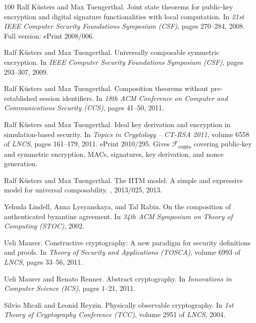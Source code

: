 \documentclass[11pt,a4paper]{article}
\begin{document}
\begin{thebibliography}{100}
Ralf K{\"u}sters and Max Tuengerthal.
\newblock Joint state theorems for public-key encryption and digital signature
  functionalities with local computation.
\newblock In {\em 21st IEEE Computer Security Foundations Symposium (CSF)},
  pages 270--284, 2008.
\newblock Full version: ePrint 2008/006.

Ralf K{\"u}sters and Max Tuengerthal.
\newblock Universally composable symmetric encryption.
\newblock In {\em IEEE Computer Security Foundations Symposium (CSF)}, pages
  293--307, 2009.

Ralf K{\"u}sters and Max Tuengerthal.
\newblock Composition theorems without pre-established session identifiers.
\newblock In {\em 18th ACM Conference on Computer and Communications Security
  (CCS)}, pages 41--50, 2011.

Ralf K{\"u}sters and Max Tuengerthal.
\newblock Ideal key derivation and encryption in simulation-based security.
\newblock In {\em Topics in Cryptology -- CT-RSA 2011}, volume 6558 of {\em
  LNCS}, pages 161--179, 2011.
\newblock ePrint 2010/295. Gives $\mathcal{F}_{\mathsf{crypto}}$ covering
  public-key and symmetric encryption, MACs, signatures, key derivation, and
  nonce generation.

Ralf K{\"u}sters and Max Tuengerthal.
\newblock The {IITM} model: A simple and expressive model for universal
  composability.
, 2013/025, 2013.

Yehuda Lindell, Anna Lysyanskaya, and Tal Rabin.
\newblock On the composition of authenticated byzantine agreement.
\newblock In {\em 34th ACM Symposium on Theory of Computing (STOC)}, 2002.

Ueli Maurer.
\newblock Constructive cryptography: A new paradigm for security definitions
  and proofs.
\newblock In {\em Theory of Security and Applications (TOSCA)}, volume 6993 of
  {\em LNCS}, pages 33--56, 2011.

Ueli Maurer and Renato Renner.
\newblock Abstract cryptography.
\newblock In {\em Innovations in Computer Science (ICS)}, pages 1--21, 2011.

Silvio Micali and Leonid Reyzin.
\newblock Physically observable cryptography.
\newblock In {\em 1st Theory of Cryptography Conference (TCC)}, volume 2951 of
  {\em LNCS}, 2004.


\end{thebibliography}
\end{document}
